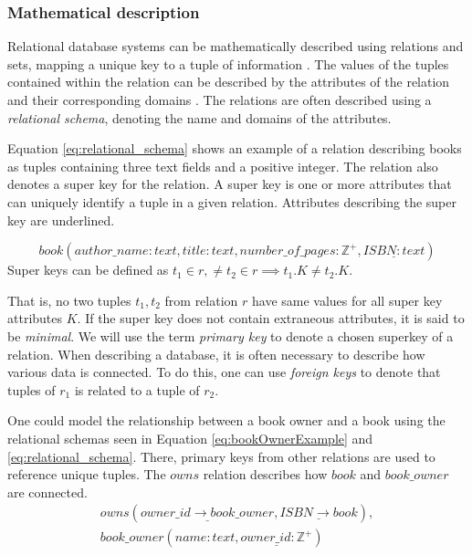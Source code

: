 \subsubsection*{Mathematical description}
Relational database systems can be mathematically described using relations and sets, mapping a unique key to a tuple of information \cite[Chapter~2.3]{DBSBook}.
The values of the tuples contained within the relation can be described by the attributes of the relation and their corresponding domains \cite{KatjaFirstPP}. 
The relations are often described using a \textit{relational schema}, denoting the name and domains of the attributes.

Equation \ref{eq:relational_schema} shows an example of a relation describing books as tuples containing three text fields and a positive integer.
The relation also denotes a super key for the relation. A super key is one or more attributes that can uniquely identify a tuple in a given relation. Attributes describing the super key are underlined.

\begin{equation} \label{eq:relational_schema}
    book(author\_name:text, title: text, number\_of\_pages:\mathbb{Z}^+, \underline{ISBN: text})
\end{equation}
Super keys can be defined as $t_1 \in r,\neq t_2 \in r \implies t_1.K \neq t_2.K$. 

That is, no two tuples $t_1, t_2$ from relation $r$ have same values for all super key attributes $K$. 
If the super key does not contain extraneous attributes, it is said to be \textit{minimal}. \cite[Chapter 2.3]{DBSBook}
We will use the term \textit{primary key} to denote a chosen superkey of a relation. 
When describing a database, it is often necessary to describe how various data is connected. 
To do this, one can use \textit{foreign keys} to denote that tuples of $r_1$ is related to a tuple of $r_2$.


One could model the relationship between a book owner and a book using the relational schemas seen in Equation \ref{eq:bookOwnerExample} and \ref{eq:relational_schema}.
There, primary keys from other relations are used to reference unique tuples. The $owns$ relation describes how $book$ and $book\_owner$ are connected. 
\begin{equation}\label{eq:bookOwnerExample}
    \begin{split}
        owns(\underline{owner\_id \rightarrow book\_owner}, \underline{ISBN \rightarrow book}), \\
        book\_owner(name:text,\underline{owner\_id:\mathbb{Z}^+})
    \end{split}
\end{equation}

